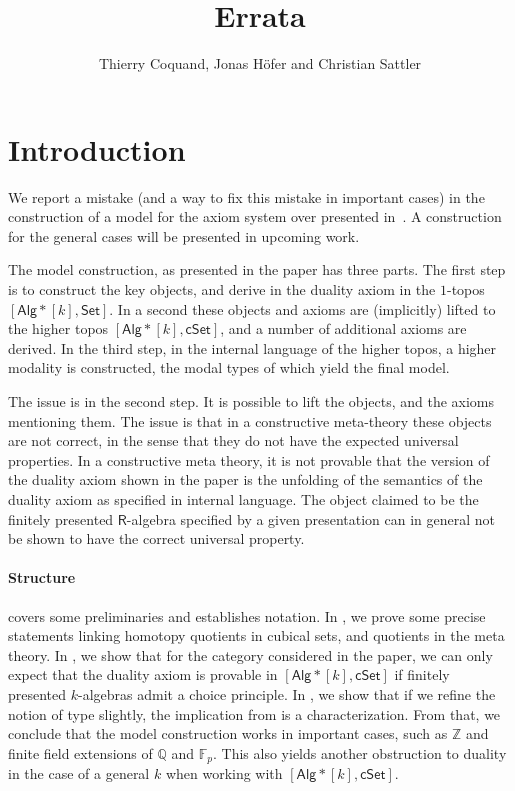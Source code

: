 \documentclass[10pt,a4paper]{article}
\newcommand{\ints}{\mathbb{Z}}
\newcommand{\rats}{\mathbb{Q}}
\newcommand{\Set}{\mathsf{Set}}
\newcommand{\cSet}{\mathsf{cSet}}
\newcommand{\Alg}{\mathsf{Alg}}
\newcommand\R{\mathsf{R}}
\begin{document}
\title{Errata}

\author{Thierry Coquand, Jonas H\"ofer and Christian Sattler}
\date{}
\maketitle


\section*{Introduction}

We report a mistake (and a way to fix this mistake in important cases) in the construction of a model for the axiom system over \HoTT{} presented in~\cite{draft}.
A construction for the general cases will be presented in upcoming work.

The model construction, as presented in the paper has three parts.
The first step is to construct the key objects, and derive in the duality axiom in the \(1\)-topos \([\Alg*[k], \Set]\).
In a second these objects and axioms are (implicitly) lifted to the higher topos \([\Alg*[k], \cSet]\), and a number of additional axioms are derived.
In the third step, in the internal language of the higher topos, a higher modality is constructed, the modal types of which yield the final model.

The issue is in the second step.
It is possible to lift the objects, and the axioms mentioning them.
The issue is that in a constructive meta-theory these objects are not correct, in the sense that they do not have the expected universal properties.
In a constructive meta theory, it is not provable that the version of the duality axiom shown in the paper is the unfolding of the semantics of the duality axiom as specified in internal language.
The object claimed to be the finitely presented \(\R\)-algebra specified by a given presentation can in general not be shown to have the correct universal property. 

\paragraph{Structure}
 covers some preliminaries and establishes notation.
In , we prove some precise statements linking homotopy quotients in cubical sets, and quotients in the meta theory.
In , we show that for the category considered in the paper, we can only expect that the duality axiom is provable in \([\Alg*[k], \cSet]\) if finitely presented \(k\)-algebras admit a choice principle.
In , we show that if we refine the notion of type slightly, the implication from  is a characterization.
From that, we conclude that the model construction works in important cases, such as \(\ints\) and finite field extensions of \(\rats\) and \(\mathbb{F}_p\). 
This also yields another obstruction to duality in the case of a general \(k\) when working with \([\Alg*[k], \cSet]\). 
\end{document}
